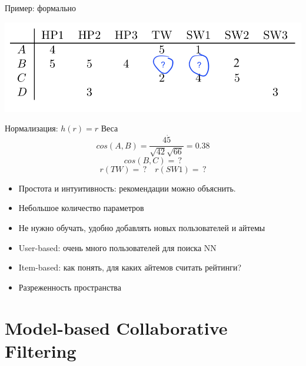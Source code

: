 \documentclass[11pt,aspectratio=169]{beamer}
\begin{document}
\begin{frame}{Пример: формально}

\begin{center}
\includegraphics[scale=0.5]{images/utility.png}
\end{center}

Нормализация: $h(r) = r$
Веса
\[
cos(A, B) = \frac{4 \dot 5}{ \sqrt{42} \sqrt{66} } = 0.38
\]
\[
cos(B, C) = \, ? 
\]
\[
r(TW) = \, ? \quad r(SW1) = \, ?
\]

\end{frame}

\begin{frame}{}

\begin{tcolorbox}[colback=info!5,colframe=info!80,title=Плюсы]
  \begin{itemize}
    \item Простота и интуитивность: рекомендации можно объяснить.
    \item Небольшое количество параметров
    \item Не нужно обучать, удобно добавлять новых пользователей и айтемы
  \end{itemize}
\end{tcolorbox}

\begin{tcolorbox}[colback=warn!5,colframe=warn!80,title=Минусы]
  \begin{itemize}
    \item User-based: очень много пользователей для поиска NN
    \item Item-based: как понять, для каких айтемов считать рейтинги?
    \item Разреженность пространства
  \end{itemize}
\end{tcolorbox}

\end{frame}

\section{Model-based Collaborative Filtering}
\end{document}
